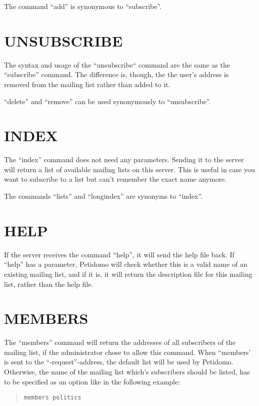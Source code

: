 \documentclass[a4paper,10pt]{scrreprt}
\begin{document}
The command ``add'' is synonymous to ``subscribe''.

\section{UNSUBSCRIBE}

The syntax and usage of the ``unsubscribe`` command are the same as the
``subscribe'' command. The difference is, though, the the user's address
is removed from the mailing list rather than added to it.

``delete'' and ``remove'' can be used synonymously to ``unsubscribe''.

\section{INDEX}

The ``index'' command does not need any parameters. Sending it to the
server will return a list of available mailing lists on this server.
This is useful in case you want to subscribe to a list but can't
remember the exact name anymore.

The commands ``lists'' and ``longindex'' are synonyms to ``index''.

\section{HELP}

If the server receives the command ``help'', it will send the help
file back. If ``help'' has a parameter, Petidomo will check whether
this is a valid name of an existing mailing list, and if it is, it
will return the description file for this mailing list, rather than
the help file.

\section{MEMBERS}

The ``members'' command will return the addresses of all subscribers
of the mailing list, if the administrator chose to allow this command.
When ``members' is sent to the ``-request''-address, the default list
will be used by Petidomo. Otherwise, the name of the mailing list
which's subscribers should be listed, has to be specified as an option
like in the following example:
\begin{quote}
\begin{verbatim}
members politics
\end{verbatim}
\end{quote}
\end{document}
